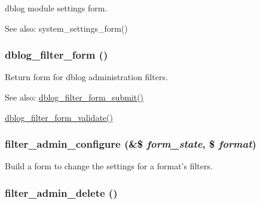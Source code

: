 dblog module settings form.

\begin{Desc}
\item[See also:]system\_\-settings\_\-form() \end{Desc}
\hypertarget{group__forms_g2e2048171c96832b8d9d1b33252abb5b}{
\subsubsection[{dblog\_\-filter\_\-form}]{\setlength{\rightskip}{0pt plus 5cm}dblog\_\-filter\_\-form ()}}
\label{group__forms_g2e2048171c96832b8d9d1b33252abb5b}


Return form for dblog administration filters.

\begin{Desc}
\item[See also:]\hyperlink{dblog_8admin_8inc_817953760089fe9caf59d187d3784433}{dblog\_\-filter\_\-form\_\-submit()} 

\hyperlink{dblog_8admin_8inc_8f88e6f1bf9010761546bbad59189b0f}{dblog\_\-filter\_\-form\_\-validate()} \end{Desc}
\hypertarget{group__forms_gcc23b948cf6b65bf3fb1febee5a51beb}{
\subsubsection[{filter\_\-admin\_\-configure}]{\setlength{\rightskip}{0pt plus 5cm}filter\_\-admin\_\-configure (\&\$ {\em form\_\-state}, \/  \$ {\em format})}}
\label{group__forms_gcc23b948cf6b65bf3fb1febee5a51beb}


Build a form to change the settings for a format's filters. \hypertarget{group__forms_g950ad134c292688bc709871c65745dda}{
\subsubsection[{filter\_\-admin\_\-delete}]{\setlength{\rightskip}{0pt plus 5cm}filter\_\-admin\_\-delete ()}}
\label{group__forms_g950ad134c292688bc709871c65745dda}



